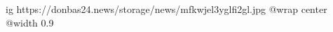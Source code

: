  
 
 
 
 

\ifcmt
  ig https://donbas24.news/storage/news/mfkwjel3yglfi2gl.jpg
  @wrap center
  @width 0.9
\fi
